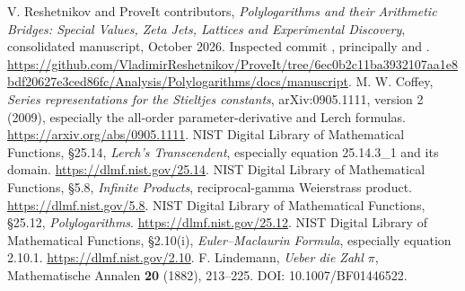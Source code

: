 
 V. Reshetnikov and ProveIt contributors, \emph{Polylogarithms and their Arithmetic Bridges: Special Values, Zeta Jets, Lattices and Experimental Discovery}, consolidated manuscript, October 2026. Inspected commit , principally  and . \url{https://github.com/VladimirReshetnikov/ProveIt/tree/6ec0b2c11ba3932107aa1e8bdf20627e3ced86fc/Analysis/Polylogarithms/docs/manuscript}.
 M. W. Coffey, \emph{Series representations for the Stieltjes constants}, arXiv:0905.1111, version 2 (2009), especially the all-order parameter-derivative and Lerch formulas. \url{https://arxiv.org/abs/0905.1111}.
 NIST Digital Library of Mathematical Functions, \S25.14, \emph{Lerch's Transcendent}, especially equation 25.14.3\_1 and its domain. \url{https://dlmf.nist.gov/25.14}.
 NIST Digital Library of Mathematical Functions, \S5.8, \emph{Infinite Products}, reciprocal-gamma Weierstrass product. \url{https://dlmf.nist.gov/5.8}.
 NIST Digital Library of Mathematical Functions, \S25.12, \emph{Polylogarithms}. \url{https://dlmf.nist.gov/25.12}.
 NIST Digital Library of Mathematical Functions, \S2.10(i), \emph{Euler--Maclaurin Formula}, especially equation 2.10.1. \url{https://dlmf.nist.gov/2.10}.
 F. Lindemann, \emph{Ueber die Zahl $\pi$}, Mathematische Annalen \textbf{20} (1882), 213--225. DOI: 10.1007/BF01446522.
